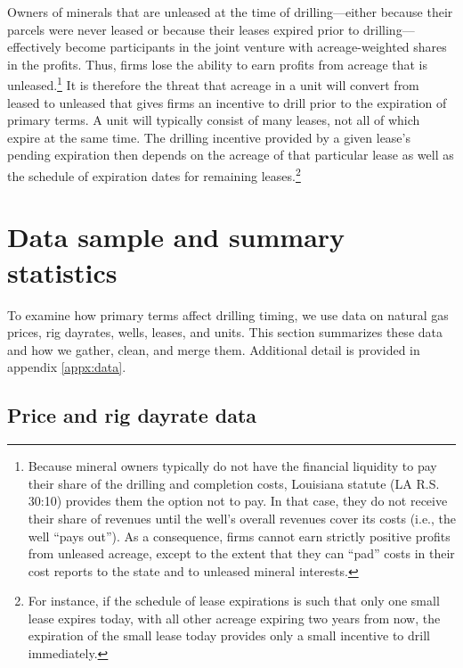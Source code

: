 \documentclass[12pt]{article}
\begin{document}
Owners of minerals that are unleased at the time of drilling---either because their parcels were never leased or because their leases expired prior to drilling---effectively become participants in the joint venture with acreage-weighted shares in the profits. Thus, firms lose the ability to earn profits from acreage that is unleased.\footnote{Because mineral owners typically do not have the financial liquidity to pay their share of the drilling and completion costs, Louisiana statute (LA R.S. 30:10) provides them the option not to pay. In that case, they do not receive their share of revenues until the well's overall revenues cover its costs (i.e., the well ``pays out''). As a consequence, firms cannot earn strictly positive profits from unleased acreage, except to the extent that they can ``pad'' costs in their cost reports to the state and to unleased mineral interests.} It is therefore the threat that acreage in a unit will convert from leased to unleased that gives firms an incentive to drill prior to the expiration of primary terms. A unit will typically consist of many leases, not all of which expire at the same time. The drilling incentive provided by a given lease's pending expiration then depends on the acreage of that particular lease as well as the schedule of expiration dates for remaining leases.\footnote{For instance, if the schedule of lease expirations is such that only one small lease expires today, with all other acreage expiring two years from now, the expiration of the small lease today provides only a small incentive to drill immediately.}


\section{Data sample and summary statistics} \label{sec:Data}

To examine how primary terms affect drilling timing, we use data on natural gas prices, rig dayrates, wells, leases, and units. This section summarizes these data and how we gather, clean, and merge them. Additional detail is provided in appendix \ref{appx:data}.

\subsection{Price and rig dayrate data} \label{sec:pricedayratedata}
\end{document}
